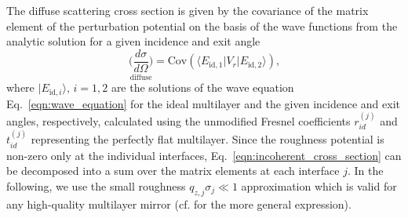 \documentclass[twocolumn,osajnl,showpacs,superscriptaddress,11pt]{revtex4-1}
\begin{document}
The diffuse scattering cross section is given by the covariance of the matrix element of the perturbation potential on the basis of the wave functions from the analytic solution for a given incidence and exit angle \cite{PhysRevB.38.2297,PhysRevB.49.10668} 
\begin{equation}
	\underset{\text{diffuse}}{\Big(\frac{d \sigma}{d \Omega}\Big)}= \text{Cov}(\langle E_{\text{id},1}| V_r|E_{\text{id},2}\rangle)\text{,} \label{eqn:incoherent_cross_section} 
\end{equation}
where $|E_{\text{id},i}\rangle\text{, }i =1,2$ are the solutions of the wave equation Eq.~\eqref{eqn:wave_equation} for the ideal multilayer and the given incidence and exit angles, respectively, calculated using the unmodified Fresnel coefficients $r_{id}^{(j)}$ and $t_{id}^{(j)}$ representing the perfectly flat multilayer. Since the roughness potential is non-zero only at the individual interfaces, Eq.~\eqref{eqn:incoherent_cross_section} can be decomposed into a sum over the matrix elements at each interface $j$. In the following, we use the small roughness $q_{z,j} \sigma_j \ll 1$ approximation which is valid for any high-quality multilayer mirror (cf. \cite{PhysRevB.53.6048} for the more general expression).
\end{document}
